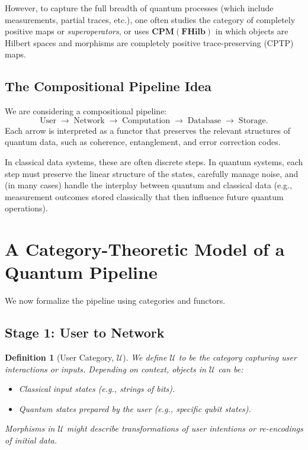 \documentclass[12pt]{article}
\newtheorem{definition}[theorem]{Definition}
\begin{document}
However, to capture the full breadth of quantum processes (which include measurements, partial traces, etc.), one often studies the category of completely positive maps or \emph{superoperators}, or uses $\mathbf{CPM}(\mathbf{FHilb})$ in which objects are Hilbert spaces and morphisms are completely positive trace-preserving (CPTP) maps.

\subsection{The Compositional Pipeline Idea}

We are considering a compositional pipeline:
\[
\text{User} \;\longrightarrow\; \text{Network} \;\longrightarrow\; 
\text{Computation} \;\longrightarrow\; \text{Database} \;\longrightarrow\; 
\text{Storage}.
\]
Each arrow is interpreted as a functor that preserves the relevant structures of quantum data, such as coherence, entanglement, and error correction codes.

In classical data systems, these are often discrete steps. In quantum systems, each step must preserve the linear structure of the states, carefully manage noise, and (in many cases) handle the interplay between quantum and classical data (e.g., measurement outcomes stored classically that then influence future quantum operations).

\section{A Category-Theoretic Model of a Quantum Pipeline}

We now formalize the pipeline using categories and functors.

\subsection{Stage 1: User to Network}

\begin{definition}[User Category, $\mathcal{U}$]
We define $\mathcal{U}$ to be the category capturing user interactions or \emph{inputs}. Depending on context, objects in $\mathcal{U}$ can be:
\begin{itemize}
\item Classical input states (e.g., strings of bits).
\item Quantum states prepared by the user (e.g., specific qubit states).
\end{itemize}
Morphisms in $\mathcal{U}$ might describe transformations of user intentions or re-encodings of initial data.
\end{definition}
\end{document}

